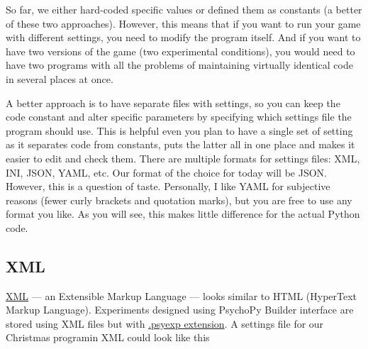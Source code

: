 \documentclass[
]{book}
\begin{document}
So far, we either hard-coded specific values or defined them as constants (a better of these two approaches). However, this means that if you want to run your game with different settings, you need to modify the program itself. And if you want to have two versions of the game (two experimental conditions), you would need to have two programs with all the problems of maintaining virtually identical code in several places at once.

A better approach is to have separate files with settings, so you can keep the code constant and alter specific parameters by specifying which settings file the program should use. This is helpful even you plan to have a single set of setting as it separates code from constants, puts the latter all in one place and makes it easier to edit and check them. There are multiple formats for settings files: XML, INI, JSON, YAML, etc. Our format of the choice for today will be JSON. However, this is a question of taste. Personally, I like YAML for subjective reasons (fewer curly brackets and quotation marks), but you are free to use any format you like. As you will see, this makes little difference for the actual Python code.

\hypertarget{xml}{%
\subsection{XML}\label{xml}}

\href{https://en.wikipedia.org/wiki/XML}{XML} --- an Extensible Markup Language --- looks similar to HTML (HyperText Markup Language). Experiments designed using PsychoPy Builder interface are stored using XML files but with \href{https://www.psychopy.org/psyexp.html}{.psyexp extension}. A settings file for our Christmas programin XML could look like this
\end{document}
